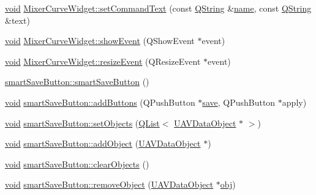 \begin{DoxyCompactItemize}
\item 
\hyperlink{group___u_a_v_objects_plugin_ga444cf2ff3f0ecbe028adce838d373f5c}{void} \hyperlink{group___u_a_v_object_widget_utils_gaa3ea4c7117915989815218e35875c190}{Mixer\-Curve\-Widget\-::set\-Command\-Text} (const \hyperlink{group___u_a_v_objects_plugin_gab9d252f49c333c94a72f97ce3105a32d}{Q\-String} \&\hyperlink{glext_8h_ad977737dfc9a274a62741b9500c49a32}{name}, const \hyperlink{group___u_a_v_objects_plugin_gab9d252f49c333c94a72f97ce3105a32d}{Q\-String} \&text)
\item 
\hyperlink{group___u_a_v_objects_plugin_ga444cf2ff3f0ecbe028adce838d373f5c}{void} \hyperlink{group___u_a_v_object_widget_utils_gadd0a4729bbf94f44e38a0bcacb353583}{Mixer\-Curve\-Widget\-::show\-Event} (Q\-Show\-Event $\ast$event)
\item 
\hyperlink{group___u_a_v_objects_plugin_ga444cf2ff3f0ecbe028adce838d373f5c}{void} \hyperlink{group___u_a_v_object_widget_utils_gaa93b51b2d0662bf28c5040a7b7386eed}{Mixer\-Curve\-Widget\-::resize\-Event} (Q\-Resize\-Event $\ast$event)
\item 
\hyperlink{group___u_a_v_object_widget_utils_gaea82e458c940bce5635289974c09f02f}{smart\-Save\-Button\-::smart\-Save\-Button} ()
\item 
\hyperlink{group___u_a_v_objects_plugin_ga444cf2ff3f0ecbe028adce838d373f5c}{void} \hyperlink{group___u_a_v_object_widget_utils_gaf6869cfd1fefcbd90df4481101aedae0}{smart\-Save\-Button\-::add\-Buttons} (Q\-Push\-Button $\ast$\hyperlink{uavobjecttemplate_8m_a79178933c5b76091ca04178d14a5ba98}{save}, Q\-Push\-Button $\ast$apply)
\item 
\hyperlink{group___u_a_v_objects_plugin_ga444cf2ff3f0ecbe028adce838d373f5c}{void} \hyperlink{group___u_a_v_object_widget_utils_gabc52b717610cbaa7e592ca114e280a7a}{smart\-Save\-Button\-::set\-Objects} (\hyperlink{class_q_list}{Q\-List}$<$ \hyperlink{class_u_a_v_data_object}{U\-A\-V\-Data\-Object} $\ast$ $>$)
\item 
\hyperlink{group___u_a_v_objects_plugin_ga444cf2ff3f0ecbe028adce838d373f5c}{void} \hyperlink{group___u_a_v_object_widget_utils_gac2164be4d041b63639a01ac473d95463}{smart\-Save\-Button\-::add\-Object} (\hyperlink{class_u_a_v_data_object}{U\-A\-V\-Data\-Object} $\ast$)
\item 
\hyperlink{group___u_a_v_objects_plugin_ga444cf2ff3f0ecbe028adce838d373f5c}{void} \hyperlink{group___u_a_v_object_widget_utils_ga0907c8e3ee212fbe30183359c0d8bc1a}{smart\-Save\-Button\-::clear\-Objects} ()
\item 
\hyperlink{group___u_a_v_objects_plugin_ga444cf2ff3f0ecbe028adce838d373f5c}{void} \hyperlink{group___u_a_v_object_widget_utils_ga3543686402e11b7eb8f0822c0a9bb4de}{smart\-Save\-Button\-::remove\-Object} (\hyperlink{class_u_a_v_data_object}{U\-A\-V\-Data\-Object} $\ast$\hyperlink{glext_8h_a0c0d4701a6c89f4f7f0640715d27ab26}{obj})

\end{DoxyCompactItemize}
